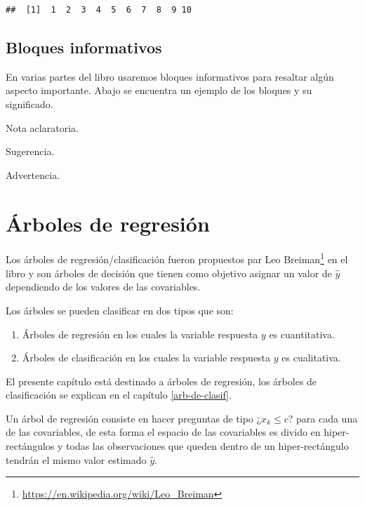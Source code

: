 \documentclass[]{book}
\providecommand{\tightlist}{%
  \setlength{\itemsep}{0pt}\setlength{\parskip}{0pt}}
\let\rmarkdownfootnote\footnote%
\def\footnote{\protect\rmarkdownfootnote}
\renewcommand{\href}[2]{#2\footnote{\url{#1}}}
\let\BeginKnitrBlock\begin \let\EndKnitrBlock\end
\begin{document}
\begin{verbatim}
##  [1]  1  2  3  4  5  6  7  8  9 10
\end{verbatim}

\hypertarget{bloques-informativos}{%
\section*{Bloques informativos}\label{bloques-informativos}}

En varias partes del libro usaremos bloques informativos para resaltar algún aspecto importante. Abajo se encuentra un ejemplo de los bloques y su significado.

\BeginKnitrBlock{rmdnote}
Nota aclaratoria.
\EndKnitrBlock{rmdnote}

\BeginKnitrBlock{rmdtip}
Sugerencia.
\EndKnitrBlock{rmdtip}

\BeginKnitrBlock{rmdwarning}
Advertencia.
\EndKnitrBlock{rmdwarning}

\hypertarget{arb-de-regre}{%
\chapter{Árboles de regresión}\label{arb-de-regre}}

Los árboles de regresión/clasificación fueron propuestos par \href{https://en.wikipedia.org/wiki/Leo_Breiman}{Leo Breiman} en el libro \citep{Breiman1984} y son árboles de decisión que tienen como objetivo asignar un valor de \(\hat{y}\) dependiendo de los valores de las covariables.

Los árboles se pueden clasificar en dos tipos que son:

\begin{enumerate}
\def\labelenumi{\arabic{enumi}.}
\tightlist
\item
  Árboles de regresión en los cuales la variable respuesta \(y\) es cuantitativa.
\item
  Árboles de clasificación en los cuales la variable respuesta \(y\) es cualitativa.
\end{enumerate}

El presente capítulo está destinado a árboles de regresión, los árboles de clasificación se explican en el capítulo \ref{arb-de-clasif}.

Un árbol de regresión consiste en hacer preguntas de tipo ¿\(x_k \leq c\)? para cada una de las covariables, de esta forma el espacio de las covariables es divido en hiper-rectángulos y todas las observaciones que queden dentro de un hiper-rectángulo tendrán el mismo valor estimado \(\hat{y}\).
\end{document}
